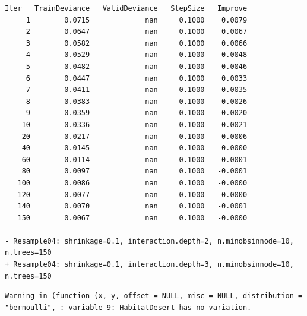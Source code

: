 \documentclass[
  letterpaper,
  DIV=11,
  numbers=noendperiod]{scrartcl}
\begin{document}
\begin{verbatim}
Iter   TrainDeviance   ValidDeviance   StepSize   Improve
     1        0.0715             nan     0.1000    0.0079
     2        0.0647             nan     0.1000    0.0067
     3        0.0582             nan     0.1000    0.0066
     4        0.0529             nan     0.1000    0.0048
     5        0.0482             nan     0.1000    0.0046
     6        0.0447             nan     0.1000    0.0033
     7        0.0411             nan     0.1000    0.0035
     8        0.0383             nan     0.1000    0.0026
     9        0.0359             nan     0.1000    0.0020
    10        0.0336             nan     0.1000    0.0021
    20        0.0217             nan     0.1000    0.0006
    40        0.0145             nan     0.1000    0.0000
    60        0.0114             nan     0.1000   -0.0001
    80        0.0097             nan     0.1000   -0.0001
   100        0.0086             nan     0.1000   -0.0000
   120        0.0077             nan     0.1000   -0.0000
   140        0.0070             nan     0.1000   -0.0001
   150        0.0067             nan     0.1000   -0.0000

- Resample04: shrinkage=0.1, interaction.depth=2, n.minobsinnode=10, n.trees=150 
+ Resample04: shrinkage=0.1, interaction.depth=3, n.minobsinnode=10, n.trees=150 
\end{verbatim}

\begin{verbatim}
Warning in (function (x, y, offset = NULL, misc = NULL, distribution =
"bernoulli", : variable 9: HabitatDesert has no variation.
\end{verbatim}
\end{document}
